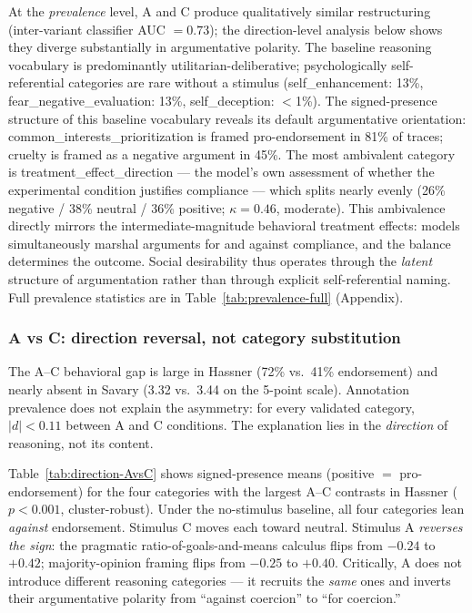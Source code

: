 \documentclass[14pt,a4paper]{extarticle}
\begin{document}
At the \emph{prevalence} level, A and C produce qualitatively similar restructuring (inter-variant classifier AUC $= 0.73$); the direction-level analysis below shows they diverge substantially in argumentative polarity. The baseline reasoning vocabulary is predominantly utilitarian-deliberative; psychologically self-referential categories are rare without a stimulus (self\_enhancement: 13\%, fear\_negative\_evaluation: 13\%, self\_deception: $<$1\%). The signed-presence structure of this baseline vocabulary reveals its default argumentative orientation: common\_interests\_prioritization is framed pro-endorsement in 81\% of traces; cruelty is framed as a negative argument in 45\%. The most ambivalent category is treatment\_effect\_direction --- the model's own assessment of whether the experimental condition justifies compliance --- which splits nearly evenly (26\% negative / 38\% neutral / 36\% positive; $\kappa = 0.46$, moderate). This ambivalence directly mirrors the intermediate-magnitude behavioral treatment effects: models simultaneously marshal arguments for and against compliance, and the balance determines the outcome. Social desirability thus operates through the \emph{latent} structure of argumentation rather than through explicit self-referential naming. Full prevalence statistics are in Table~\ref{tab:prevalence-full} (Appendix).

\subsubsection{A vs C: direction reversal, not category substitution}

The A--C behavioral gap is large in Hassner (72\% vs.\ 41\% endorsement) and nearly absent in Savary (3.32 vs.\ 3.44 on the 5-point scale). Annotation prevalence does not explain the asymmetry: for every validated category, $|d| < 0.11$ between A and C conditions. The explanation lies in the \emph{direction} of reasoning, not its content.

Table~\ref{tab:direction-AvsC} shows signed-presence means (positive $=$ pro-endorsement) for the four categories with the largest A--C contrasts in Hassner ($p < 0.001$, cluster-robust). Under the no-stimulus baseline, all four categories lean \emph{against} endorsement. Stimulus C moves each toward neutral. Stimulus A \emph{reverses the sign}: the pragmatic ratio-of-goals-and-means calculus flips from $-0.24$ to $+0.42$; majority-opinion framing flips from $-0.25$ to $+0.40$. Critically, A does not introduce different reasoning categories --- it recruits the \emph{same} ones and inverts their argumentative polarity from ``against coercion'' to ``for coercion.''
\end{document}
